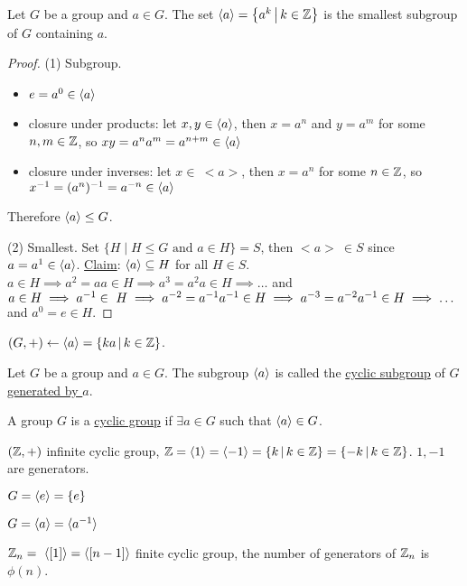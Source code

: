 \documentclass[]{article}
\begin{document}
\begin{theorem}
	Let $G$ be a group and $a\in G$. The set $\langle a \rangle = \left\{ a^k \, \middle| \, k\in \mathbb{Z} \right\}$ is the smallest subgroup of $G$ containing $a$.
\end{theorem}
\begin{proof}
	(1) Subgroup.
	\begin{itemize}
		\item $e = a^0 \in\langle a \rangle$
		\item closure under products: let $x,y\in\langle a \rangle$, then $x = a^n$ and $y=a^m$ for some $n,m\in\mathbb{Z}$, so $xy = a^na^m = a^{n+m}\in\langle a \rangle$
		\item closure under inverses: let $x\in\ <a>$, then $x=a^n$ for some $n\in\mathbb{Z}$, so $x^{-1} = (a^n)^{-1} = a^{-n}\in\langle a \rangle$
	\end{itemize}
	Therefore $\langle a \rangle\leq G$.

	(2) Smallest.
	Set $\{H\mid H\leq G \text{ and } a\in H\} = S$, then $<a>\ \in S$ since $a = a^1 \in\langle a \rangle$. \ul{Claim}: $\langle a \rangle \subseteq H$ for all $H\in S$.
	$a\in H \implies a^2 = aa\in H \implies a^3 = a^2a\in H \implies \dots$ and $a\in H\implies a^{-1}\in~H \implies a^{-2} = a^{-1} a^{-1} \in H \implies a^{-3} = a^{-2}a^{-1} \in H \implies \dots$ and $a^0 = e\in H$.
\end{proof}
\begin{note}
	$(G,+) \leftarrow\langle a \rangle = \left\{ ka \, \middle| \, k\in\mathbb{Z} \right\}$.
\end{note}
\begin{definition}
	Let $G$ be a group and $a\in G$. The subgroup $\langle a \rangle$ is called the \ul{cyclic subgroup} of $G$ \ul{generated by $a$}.
\end{definition}
\begin{definition}
	A group $G$ is a \ul{cyclic group} if $\exists a\in G$ such that $\langle a \rangle \in G$.
\end{definition}
\begin{example}
	$(\mathbb{Z},+)$ infinite cyclic group, $\mathbb{Z} =\langle 1 \rangle =\langle -1 \rangle = \left\{ k \, \middle| \, k\in\mathbb{Z} \right\} = \left\{ -k \, \middle| \, k\in\mathbb{Z} \right\}$. $1,-1$ are generators.
\end{example}
\begin{example}
	$G =\langle e \rangle = \left\{ e \right\}$
\end{example}
\begin{remark}
	$G =\langle a \rangle = \langle a^{-1} \rangle$
\end{remark}
\begin{example}
	$\mathbb{Z}_n =\ \langle [1] \rangle =\langle [n-1] \rangle$ finite cyclic group, the number of generators of $\mathbb{Z}_n$ is $\phi(n)$.
\end{example}
\end{document}
